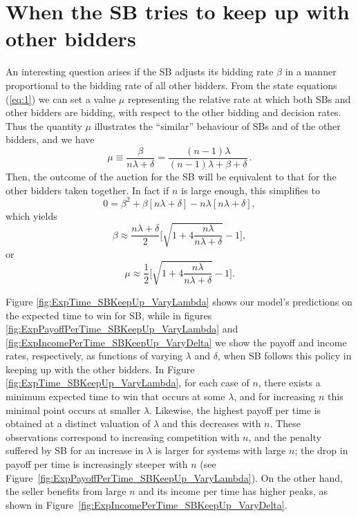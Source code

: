 \documentclass{article}
\begin{document}
\section{When the SB tries to keep up with other bidders} \label{KeepUp}

An interesting question arises if the SB adjusts its bidding rate
$\beta$ in a manner proportional to the bidding rate of all other
bidders. From the state equations (\ref{eq:1}) we can set a value
$\mu$ representing the relative rate at which both SBs and other
bidders are bidding, with respect to the other bidding and
decision rates. Thus the quantity $\mu$ illustrates the
``similar'' behaviour of SBs and of the other bidders, and we have
\begin{equation}
\mu\equiv\frac{\beta}{n\lambda+\delta}=\frac{(n-1)\lambda}{(n-1)\lambda+\beta+\delta}
\,. \nonumber
\end{equation}
Then, the outcome of the auction for the SB will be equivalent to
that for the other bidders taken together. In fact if $n$ is large
enough, this simplifies to
\begin{equation}\label{eq}
0 = \beta^2+\beta[n\lambda+\delta]-n\lambda[n\lambda+\delta],
\end{equation}
which yields
\begin{equation}
\beta\approx\frac{n\lambda+\delta}{2}\bigg[\sqrt{1+4\frac{n\lambda}{n\lambda+\delta}}
-1\bigg], \label{beta}
\end{equation}
or
\begin{equation}
\mu\approx\frac{1}{2}\bigg[\sqrt{1+4\frac{n\lambda}{n\lambda+\delta}}
-1\bigg] .\label{mu}
\end{equation}


Figure \ref{fig:ExpTime_SBKeepUp_VaryLambda} shows our model's
predictions on the expected time to win for SB, while in figures
\ref{fig:ExpPayoffPerTime_SBKeepUp_VaryLambda} and
\ref{fig:ExpIncomePerTime_SBKeepUp_VaryDelta} we show the payoff
and income rates, respectively, as functions of varying $\lambda$
and $\delta$, when SB follows this policy in keeping up with the
other bidders. In Figure \ref{fig:ExpTime_SBKeepUp_VaryLambda},
for each case of $n$, there exists a minimum expected time to win
that occurs at some $\lambda$, and for increasing $n$ this minimal
point occurs at smaller $\lambda$. Likewise, the highest payoff
per time is obtained at a distinct valuation of $\lambda$ and this
decreases with $n$. These observations correspond to increasing
competition with $n$, and the penalty suffered by SB for an
increase in $\lambda$ is larger for systems with large $n$; the
drop in payoff per time is increasingly steeper with $n$ (see
Figure~\ref{fig:ExpPayoffPerTime_SBKeepUp_VaryLambda}). On the
other hand, the seller benefits from large $n$ and its income per
time has higher peaks, as shown in
Figure~\ref{fig:ExpIncomePerTime_SBKeepUp_VaryDelta}.
\end{document}
